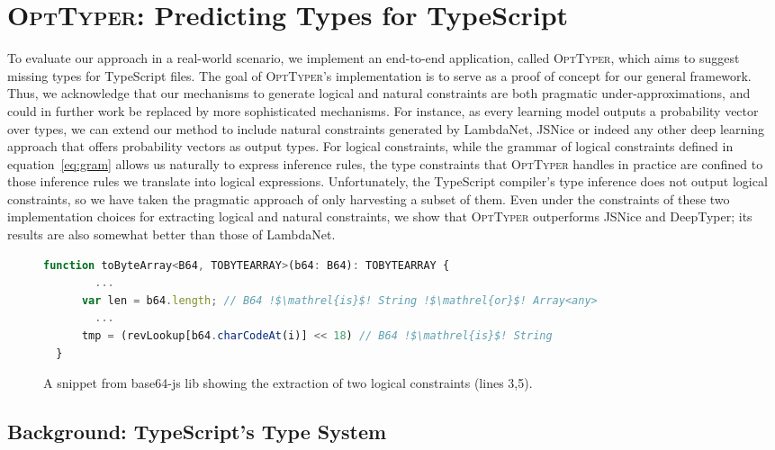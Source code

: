 \documentclass[acmsmall, review, anonymous]{acmart}\settopmatter{printfolios=true,printccs=false,printacmref=false}
\newcommand{\projectname}{\textsc{OptTyper}\xspace}
\begin{document}
\section{\projectname: Predicting Types for TypeScript}
\label{sec:prodts}
To evaluate our approach in a real-world scenario, we
implement an end-to-end application, called \projectname, which aims
to suggest missing types for TypeScript files. The goal of
\projectname{}'s implementation 
is to serve as a proof of concept for our general framework. Thus, we acknowledge that our mechanisms to generate logical and natural constraints are both pragmatic under-approximations, and could in further work be replaced by more sophisticated mechanisms.
For instance, as every learning model outputs a probability vector over types, we can extend our method to include natural constraints generated by LambdaNet, JSNice or indeed any other deep learning approach that offers probability vectors as output types. 
For logical constraints, while
the grammar of logical constraints defined
in equation~\eqref{eq:gram} allows us naturally to express inference rules, the type constraints that \projectname handles in practice are confined to  
those inference rules we translate into logical expressions.
Unfortunately, the TypeScript compiler's type inference does not output logical constraints, so we 
have taken the pragmatic approach of only 
harvesting a subset of them. 
Even under the constraints of these two implementation choices for extracting logical and natural constraints, we show that \projectname outperforms JSNice and DeepTyper; its results are also somewhat better than those of LambdaNet.
\begin{figure*}[t]
    \begin{minipage}[c]{\textwidth}
\begin{lstlisting}[language=JavaScript]
   function toByteArray<B64, TOBYTEARRAY>(b64: B64): TOBYTEARRAY {
        ...
      var len = b64.length; // B64 !$\mathrel{is}$! String !$\mathrel{or}$! Array<any>
        ...
      tmp = (revLookup[b64.charCodeAt(i)] << 18) // B64 !$\mathrel{is}$! String
  }
\end{lstlisting}
    \vspace{-7mm}
    \end{minipage}
    \caption{A snippet from base64-js lib showing the extraction of two logical constraints (lines 3,5).}\label{fig:jscode-base64}
\end{figure*}

\subsection{Background: TypeScript's Type System}~\label{ssec:intro-typescript}
\end{document}
